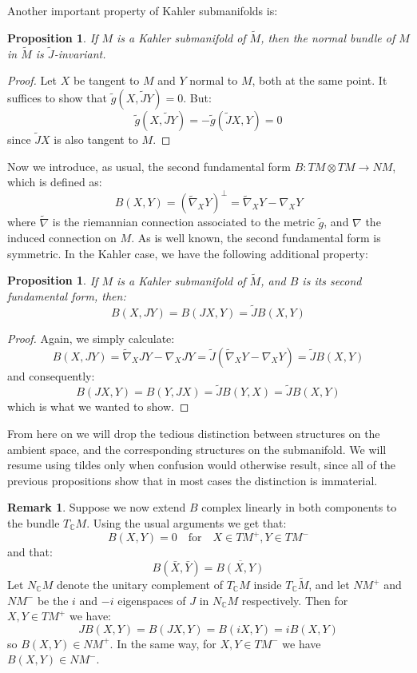 \documentclass[11pt]{amsart}
\newtheorem{prop}[subsection]{Proposition}
\def \Mamb{ \tilde{M} }
\def \Jamb{ \tilde{J} }
\def \gamb{ \tilde{g} }
\def \nablaamb{ \tilde{\nabla} }
\def \C{ \mathbb{C} }
\theoremstyle{definition}
\newtheorem{remark}[subsection]{Remark}
\begin{document}
Another important property of Kahler submanifolds is:

\begin{prop} If $M$ is a Kahler submanifold of $\Mamb$, then the normal bundle of $M$ in $\Mamb$ is $\Jamb$-invariant.
\end{prop}

\begin{proof} 
%
Let $X$ be tangent to $M$ and $Y$ normal to $M$, both at the same point.  It suffices to show that $\gamb (X, \Jamb Y) = 0$.  But:
%
$$ \gamb (X, \Jamb Y) = - \gamb ( \Jamb X, Y) = 0 $$
%
since $ \Jamb X$ is also tangent to $M$.
%
\end{proof}

Now we introduce, as usual, the second fundamental form $B: TM \otimes TM \rightarrow NM$, which is defined as:
%
$$ B(X,Y) = (\nablaamb_X Y)^{\perp} = \nablaamb_X Y - \nabla_X Y $$
%
where $\nablaamb$ is the riemannian connection associated to the metric $\gamb$, and $\nabla$ the induced connection on $M$.  As is well known, the second fundamental form is symmetric.  In the Kahler case, we have the following additional property:
%
\begin{prop}
%
If $M$ is a Kahler submanifold of $\Mamb$, and $B$ is its second fundamental form, then:
%
$$ B(X,JY) = B(JX,Y) = \Jamb B(X,Y) $$
%
\end{prop}

\begin{proof}
%
Again, we simply calculate:
%
$$ B(X, JY) = \nablaamb_X J Y - \nabla_X JY = \Jamb ( \nablaamb_X Y - \nabla_X Y ) = \Jamb B(X,Y) $$
% 
and consequently:
%
$$ B( JX, Y ) = B( Y, JX ) = \Jamb B (Y,X) = \Jamb B(X,Y) $$
%
which is what we wanted to show.
%
\end{proof}

From here on we will drop the tedious distinction between structures on the ambient space, and the corresponding structures on the submanifold. We will resume using tildes only when confusion would otherwise result, since all of the previous propositions show that in most cases the distinction is immaterial.

\begin{remark}  Suppose we now extend $B$ complex linearly in both components to the bundle $T_{\C}M$.  Using the usual arguments we get that:
%
$$ B(X,Y) = 0 \quad \text{for} \quad X \in TM^{+}, Y \in TM^{-} $$
%
and that:
%
$$ B(\bar{X}, \bar{Y} ) = \overline{ B(X,Y) } $$
%
Let $N_{\C}M$ denote the unitary complement of $T_{\C}M$ inside $T_{\C} \Mamb$, and let $NM^{+}$ and $NM^{-}$ be the $i$ and $-i$ eigenspaces of $J$ in $N_{\C}M$ respectively.  Then for $X,Y \in TM^{+}$ we have:
%
$$ J B(X,Y) = B( JX, Y ) = B( iX, Y ) = i B(X,Y) $$
%
so $B(X,Y) \in NM^{+}$.  In the same way, for $X,Y \in TM^{-}$ we have $B(X,Y) \in NM^{-}$.
%
\end{remark}
\end{document}
